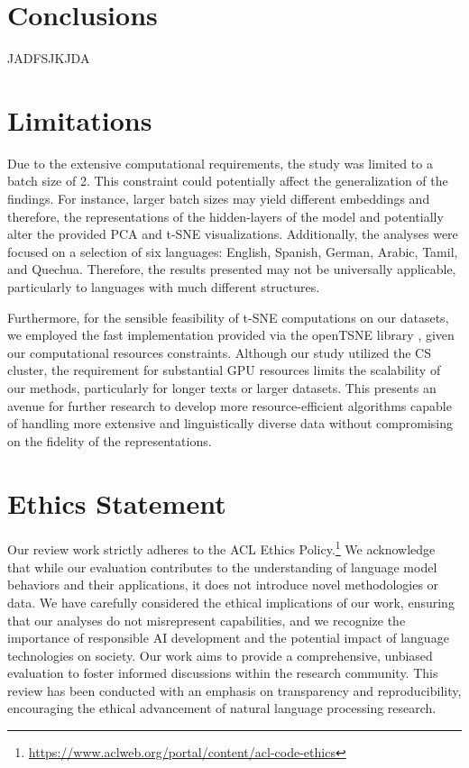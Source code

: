 \documentclass[11pt]{article}
\begin{document}
\section{Conclusions}

JADFSJKJDA

\section*{Limitations}
Due to the extensive computational requirements, the study was limited to a batch size of 2. This constraint could potentially affect the generalization of the findings. For instance, larger batch sizes may yield different embeddings and therefore, the representations of the hidden-layers of the model and potentially alter the provided PCA and t-SNE visualizations. Additionally, the analyses were focused on a selection of six languages: English, Spanish, German, Arabic, Tamil, and Quechua. Therefore, the results presented may not be universally applicable, particularly to languages with much different structures.

Furthermore, for the sensible feasibility of t-SNE computations on our datasets, we employed the fast implementation provided via the openTSNE library \cite{opentsne}, given our computational resources constraints. Although our study utilized the CS cluster, the requirement for substantial GPU resources limits the scalability of our methods, particularly for longer texts or larger datasets. This presents an avenue for further research to develop more resource-efficient algorithms capable of handling more extensive and linguistically diverse data without compromising on the fidelity of the representations.

\section*{Ethics Statement}
Our review work strictly adheres to the ACL Ethics Policy.\footnote{\url{https://www.aclweb.org/portal/content/acl-code-ethics}} We acknowledge that while our evaluation contributes to the understanding of language model behaviors and their applications, it does not introduce novel methodologies or data. We have carefully considered the ethical implications of our work, ensuring that our analyses do not misrepresent capabilities, and we recognize the importance of responsible AI development and the potential impact of language technologies on society. Our work aims to provide a comprehensive, unbiased evaluation to foster informed discussions within the research community. This review has been conducted with an emphasis on transparency and reproducibility, encouraging the ethical advancement of natural language processing research.
\end{document}
